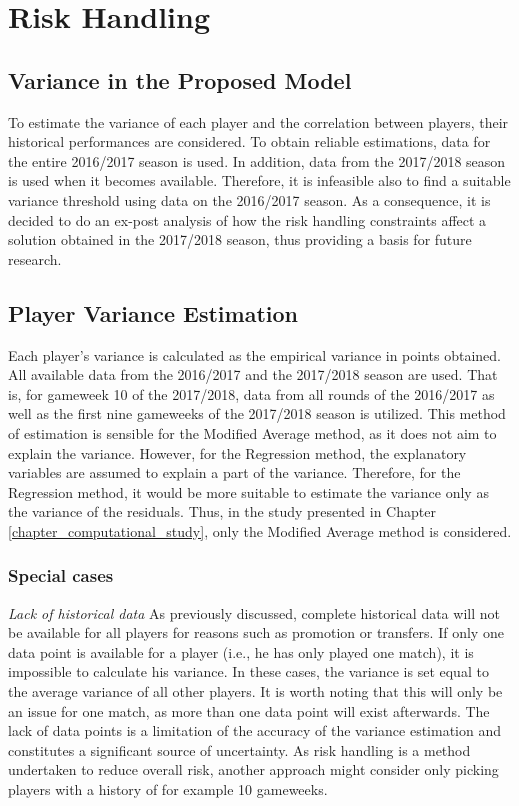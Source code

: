  
\section{Risk Handling} \label{exp_setup_Value_Variance}

\subsection{Variance in the Proposed Model}

To estimate the variance of each player and the correlation between players, their historical performances are considered. To obtain reliable estimations, data for the entire 2016/2017 season is used. In addition, data from the 2017/2018 season is used when it becomes available. Therefore, it is infeasible also to find a suitable variance threshold using data on the 2016/2017 season. As a consequence, it is decided to do an ex-post analysis of how the risk handling constraints affect a solution obtained in the 2017/2018 season, thus providing a basis for future research.

\subsection{Player Variance Estimation}

Each player's variance is calculated as the empirical variance in points obtained. All available data from the 2016/2017 and the 2017/2018 season are used. That is, for gameweek 10 of the 2017/2018, data from all rounds of the 2016/2017 as well as the first nine gameweeks of the 2017/2018 season is utilized. This method of estimation is sensible for the Modified Average method, as it does not aim to explain the variance. However, for the Regression method, the explanatory variables are assumed to explain a part of the variance. Therefore, for the Regression method, it would be more suitable to estimate the variance only as the variance of the residuals. Thus, in the study presented in Chapter \ref{chapter_computational_study}, only the Modified Average method is considered.

\subsubsection{Special cases}

\textit{Lack of historical data}
\newline
As previously discussed, complete historical data will not be available for all players for reasons such as promotion or transfers. If only one data point is available for a player (i.e., he has only played one match), it is impossible to calculate his variance. In these cases, the variance is set equal to the average variance of all other players. It is worth noting that this will only be an issue for one match, as more than one data point will exist afterwards. The lack of data points is a limitation of the accuracy of the variance estimation and constitutes a significant source of uncertainty. As risk handling is a method undertaken to reduce overall risk, another approach might consider only picking players with a history of for example 10 gameweeks.

